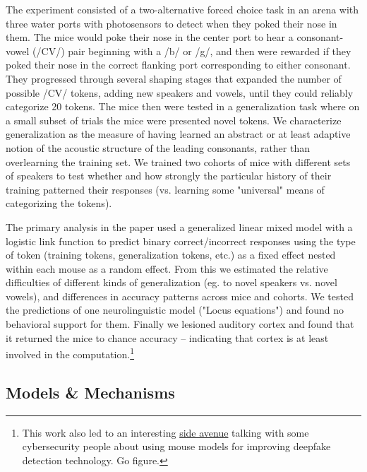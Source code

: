 \begin{done}
The experiment consisted of a two-alternative forced choice task in an arena with three water ports with photosensors to detect when they poked their nose in them. The mice would poke their nose in the center port to hear a consonant-vowel (/CV/) pair beginning with a /b/ or /g/, and then were rewarded if they poked their nose in the correct flanking port corresponding to either consonant. They progressed through several shaping stages that expanded the number of possible /CV/ tokens, adding new speakers and vowels, until they could reliably categorize 20 tokens. The mice then were tested in a generalization task where on a small subset of trials the mice were presented novel tokens. We characterize generalization as the measure of having learned an abstract or at least adaptive notion of the acoustic structure of the leading consonants, rather than overlearning the training set. We trained two cohorts of mice with different sets of speakers to test whether and how strongly the particular history of their training patterned their responses (vs. learning some "universal" means of categorizing the tokens).

The primary analysis in the paper used a generalized linear mixed model with a logistic link function to predict binary correct/incorrect responses using the type of token (training tokens, generalization tokens, etc.) as a fixed effect nested within each mouse as a random effect. From this we estimated the relative difficulties of different kinds of generalization (eg. to novel speakers vs. novel vowels), and differences in accuracy patterns across mice and cohorts. We tested the predictions of one neurolinguistic model ("Locus equations") and found no behavioral support for them. Finally we lesioned auditory cortex and found that it returned the mice to chance accuracy -- indicating that cortex is at least involved in the computation.\footnote{This work also led to an interesting \href{https://www.blackhat.com/us-19/briefings/schedule/\#detecting-deep-fakes-with-mice-14467}{side avenue} talking with some cybersecurity people about using mouse models for improving deepfake detection technology. Go figure.}
\end{done}

\subsection{Models \& Mechanisms}


